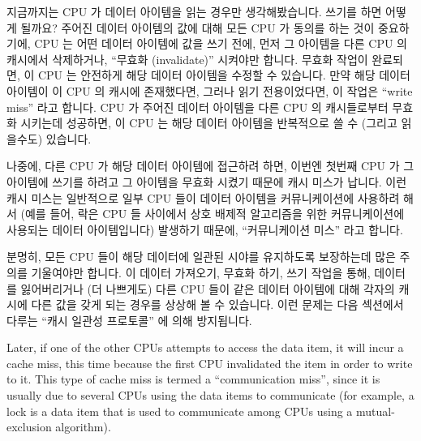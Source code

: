 지금까지는 CPU 가 데이터 아이템을 읽는 경우만 생각해봤습니다.
쓰기를 하면 어떻게 될까요?
주어진 데이터 아이템의 값에 대해 모든 CPU 가 동의를 하는 것이 중요하기에, CPU
는 어떤 데이터 아이템에 값을 쓰기 전에, 먼저 그 아이템을 다른 CPU 의 캐시에서
삭제하거나, ``무효화 (invalidate)'' 시켜야만 합니다.
무효화 작업이 완료되면, 이 CPU 는 안전하게 해당 데이터 아이템을 수정할 수
있습니다.
만약 해당 데이터 아이템이 이 CPU 의 캐시에 존재했다면, 그러나 읽기
전용이었다면, 이 작업은 ``write miss'' 라고 합니다.
CPU 가 주어진 데이터 아이템을 다른 CPU 의 캐시들로부터 무효화 시키는데
성공하면, 이 CPU 는 해당 데이터 아이템을 반복적으로 쓸 수 (그리고 읽을수도)
있습니다.
\iffalse

Thus far, we have been considering only cases where a CPU reads
a data item.
What happens when it does a write?
Because it is important that all CPUs agree on the value of a given
data item, before a given CPU writes to that data item, it must first
cause it to be removed, or ``invalidated'', from other CPUs' caches.
Once this invalidation has completed, the CPU may safely modify the
data item.
If the data item was present in this CPU's cache, but was read-only,
this process is termed a ``write miss''.
Once a given CPU has completed invalidating a given data item from other
CPUs' caches, that CPU may repeatedly write (and read) that data item.
\fi

나중에, 다른 CPU 가 해당 데이터 아이템에 접근하려 하면, 이번엔 첫번째 CPU 가 그
아이템에 쓰기를 하려고 그 아이템을 무효화 시켰기 때문에 캐시 미스가 납니다.
이런 캐시 미스는 일반적으로 일부 CPU 들이 데이터 아이템을 커뮤니케이션에
사용하려 해서 (예를 들어, 락은 CPU 들 사이에서 상호 배제적 알고리즘을 위한
커뮤니케이션에 사용되는 데이터 아이템입니다) 발생하기 때문에, ``커뮤니케이션
미스'' 라고 합니다.

분명히, 모든 CPU 들이 해당 데이터에 일관된 시야를 유지하도록 보장하는데 많은
주의를 기울여야만 합니다.
이 데이터 가져오기, 무효화 하기, 쓰기 작업을 통해, 데이터를 잃어버리거나 (더
나쁘게도) 다른 CPU 들이 같은 데이터 아이템에 대해 각자의 캐시에 다른 값을 갖게
되는 경우를 상상해 볼 수 있습니다.
이런 문제는 다음 섹션에서 다루는 ``캐시 일관성 프로토콜'' 에 의해 방지됩니다.
\iffalse

Later, if one of the other CPUs attempts to access the data item, it
will incur a cache miss, this time because the first CPU invalidated
the item in order to write to it.
This type of cache miss is termed a ``communication miss'', since it
is usually due to several CPUs using the data items to communicate
(for example, a lock is a data item that is used to communicate among
CPUs using a mutual-exclusion algorithm).

